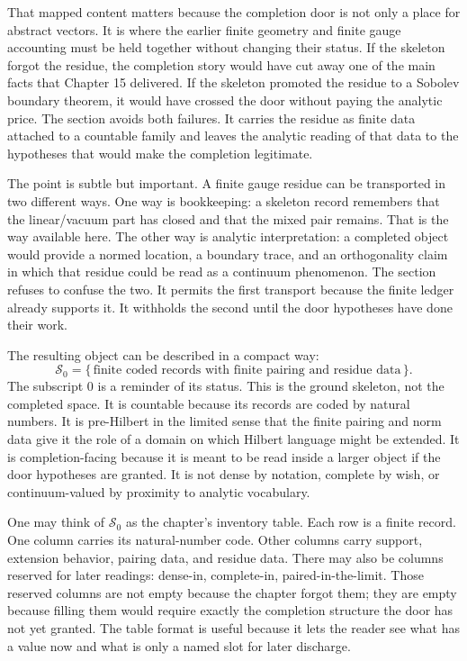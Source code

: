 That mapped content matters because the completion door is not only a place for
abstract vectors. It is where the earlier finite geometry and finite gauge
accounting must be held together without changing their status. If the
skeleton forgot the residue, the completion story would have cut away one of
the main facts that Chapter 15 delivered. If the skeleton promoted the residue
to a Sobolev boundary theorem, it would have crossed the door without paying
the analytic price. The section avoids both failures. It carries the residue as
finite data attached to a countable family and leaves the analytic reading of
that data to the hypotheses that would make the completion legitimate.

The point is subtle but important. A finite gauge residue can be transported in
two different ways. One way is bookkeeping: a skeleton record remembers that
the linear/vacuum part has closed and that the mixed pair remains. That is the
way available here. The other way is analytic interpretation: a completed
object would provide a normed location, a boundary trace, and an orthogonality
claim in which that residue could be read as a continuum phenomenon. The
section refuses to confuse the two. It permits the first transport because the
finite ledger already supports it. It withholds the second until the door
hypotheses have done their work.

The resulting object can be described in a compact way:
\[
  \mathcal{S}_{0}
    = \{\,\text{finite coded records with finite pairing and residue data}\,\}.
\]
The subscript \(0\) is a reminder of its status. This is the ground skeleton,
not the completed space. It is countable because its records are coded by
natural numbers. It is pre-Hilbert in the limited sense that the finite pairing
and norm data give it the role of a domain on which Hilbert language might be
extended. It is completion-facing because it is meant to be read inside a
larger object if the door hypotheses are granted. It is not dense by notation,
complete by wish, or continuum-valued by proximity to analytic vocabulary.

One may think of \(\mathcal{S}_{0}\) as the chapter's inventory table. Each
row is a finite record. One column carries its natural-number code. Other
columns carry support, extension behavior, pairing data, and residue data.
There may also be columns reserved for later readings: dense-in, complete-in,
paired-in-the-limit. Those reserved columns are not empty because the chapter
forgot them; they are empty because filling them would require exactly the
completion structure the door has not yet granted. The table format is useful
because it lets the reader see what has a value now and what is only a named
slot for later discharge.

